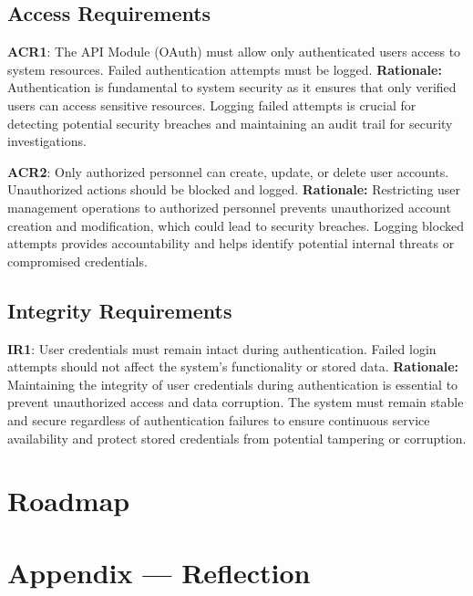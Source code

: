 \documentclass{article}
\begin{document}
\subsection{Access Requirements}
\textbf{ACR1}: The API Module (OAuth) must allow only authenticated users access to system resources. Failed authentication attempts must be logged.
\noindent \textbf{Rationale:} Authentication is fundamental to system security as it ensures that only verified users can access sensitive resources. Logging failed attempts is crucial for detecting potential security breaches and maintaining an audit trail for security investigations.

\noindent \textbf{ACR2}: Only authorized personnel can create, update, or delete user accounts. Unauthorized actions should be blocked and logged.
\noindent \textbf{Rationale:} Restricting user management operations to authorized personnel prevents unauthorized account creation and modification, which could lead to security breaches. Logging blocked attempts provides accountability and helps identify potential internal threats or compromised credentials.

\subsection{Integrity Requirements}
\textbf{IR1}: User credentials must remain intact during authentication. Failed login attempts should not affect the system's functionality or stored data.
\noindent \textbf{Rationale:} Maintaining the integrity of user credentials during authentication is essential to prevent unauthorized access and data corruption. The system must remain stable and secure regardless of authentication failures to ensure continuous service availability and protect stored credentials from potential tampering or corruption.

\section{Roadmap}


\newpage{}

\section*{Appendix --- Reflection}
\end{document}
